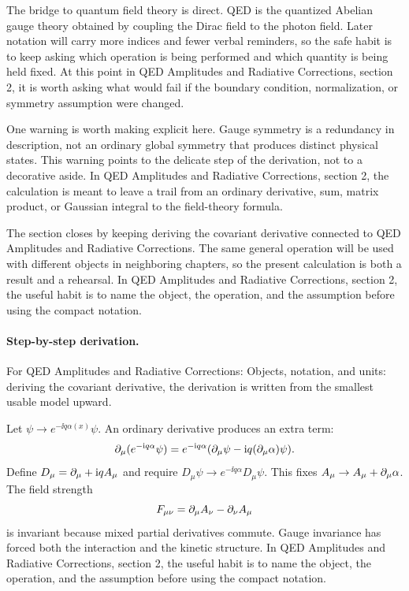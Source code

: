 The bridge to quantum field theory is direct.  QED is the quantized Abelian gauge theory obtained by coupling the Dirac field to the photon field.  Later notation will carry more indices and fewer verbal reminders, so the safe habit is to keep asking which operation is being performed and which quantity is being held fixed.  At this point in QED Amplitudes and Radiative Corrections, section 2, it is worth asking what would fail if the boundary condition, normalization, or symmetry assumption were changed.

One warning is worth making explicit here.  Gauge symmetry is a redundancy in description, not an ordinary global symmetry that produces distinct physical states.  This warning points to the delicate step of the derivation, not to a decorative aside.  In QED Amplitudes and Radiative Corrections, section 2, the calculation is meant to leave a trail from an ordinary derivative, sum, matrix product, or Gaussian integral to the field-theory formula.

The section closes by keeping deriving the covariant derivative connected to QED Amplitudes and Radiative Corrections.  The same general operation will be used with different objects in neighboring chapters, so the present calculation is both a result and a rehearsal.  In QED Amplitudes and Radiative Corrections, section 2, the useful habit is to name the object, the operation, and the assumption before using the compact notation.



\paragraph{Step-by-step derivation.}

For QED Amplitudes and Radiative Corrections: Objects, notation, and units: deriving the covariant derivative, the derivation is written from the smallest usable model upward.

Let \(\psi\to e^{-\ii q\alpha(x)}\psi\).  An ordinary derivative produces an extra term:
\[
  \partial_\mu(e^{-\mathrm i q\alpha}\psi)
  =
  e^{-\mathrm i q\alpha}(\partial_\mu\psi-\mathrm i q(\partial_\mu\alpha)\psi).
\]
Define \(D_\mu=\partial_\mu+\mathrm i qA_\mu\) and require \(D_\mu\psi\to e^{-\ii q\alpha}D_\mu\psi\).  This fixes \(A_\mu\to A_\mu+\partial_\mu\alpha\).  The field strength
\[
  F_{\mu\nu}=\partial_\mu A_\nu-\partial_\nu A_\mu
\]
is invariant because mixed partial derivatives commute.  Gauge invariance has forced both the interaction and the kinetic structure.  In QED Amplitudes and Radiative Corrections, section 2, the useful habit is to name the object, the operation, and the assumption before using the compact notation.

